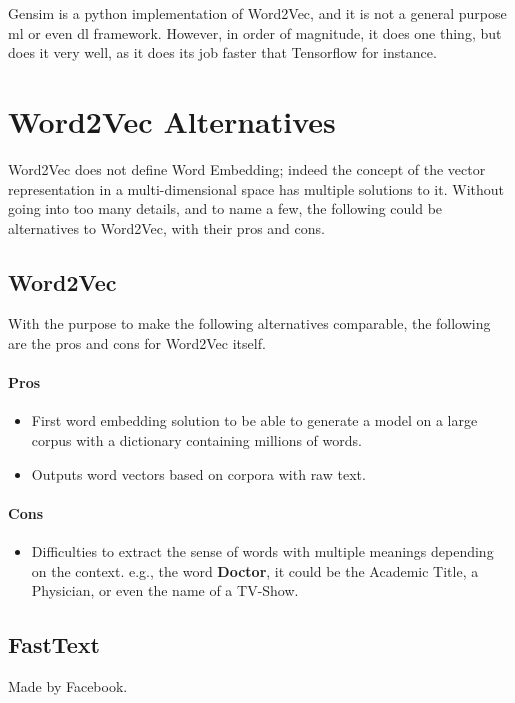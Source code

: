 Gensim is a python implementation of Word2Vec, and it is not a general purpose \gls{ml} or even \gls{dl} framework. However, in order of magnitude, it does one thing, but does it very well, as it does its job faster that Tensorflow\cite{article:tensorflow2015-whitepaper} for instance.

\section{Word2Vec Alternatives}
Word2Vec does not define Word Embedding; indeed the concept of the vector representation in a multi-dimensional space has multiple solutions to it. Without going into too many details, and to name a few, the following could be alternatives to Word2Vec, with their pros and cons.

\subsection{Word2Vec\cite{article:word2vec}}
\label{stoa:word2vec-pros-cons}
With the purpose to make the following alternatives comparable, the following are the pros and cons for Word2Vec itself.
\paragraph{Pros}
\begin{itemize}
    \setlength\itemsep{0em}
    \item First word embedding solution to be able to generate a model on a large corpus with a dictionary containing millions of words.
    \item Outputs word vectors based on corpora with raw text.
\end{itemize}
\paragraph{Cons}
\begin{itemize}
    \setlength\itemsep{0em}
    \item Difficulties to extract the sense of words with multiple meanings depending on the context. e.g., the word \textbf{Doctor}, it could be the Academic Title, a Physician, or even the name of a TV-Show.
\end{itemize}

\subsection{FastText\cite{article:fasttext}}
Made by Facebook.
